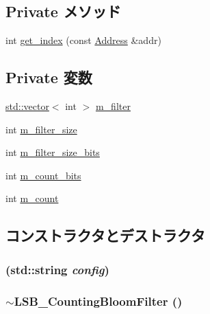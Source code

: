 \subsection*{Private メソッド}
\begin{DoxyCompactItemize}
\item 
int \hyperlink{classLSB__CountingBloomFilter_a0a9fd2f2f75033080fc27830f7c0fe64}{get\_\-index} (const \hyperlink{classAddress}{Address} \&addr)
\end{DoxyCompactItemize}
\subsection*{Private 変数}
\begin{DoxyCompactItemize}
\item 
\hyperlink{classstd_1_1vector}{std::vector}$<$ int $>$ \hyperlink{classLSB__CountingBloomFilter_aae3fd71ce4b5e8910aa63829ba6abd41}{m\_\-filter}
\item 
int \hyperlink{classLSB__CountingBloomFilter_af53abddc4707ab403450239a6e94c486}{m\_\-filter\_\-size}
\item 
int \hyperlink{classLSB__CountingBloomFilter_a5c26703945ae76ff80ec6951cccea29c}{m\_\-filter\_\-size\_\-bits}
\item 
int \hyperlink{classLSB__CountingBloomFilter_a2a94c7f05c32eec5b5e5a2f12518f930}{m\_\-count\_\-bits}
\item 
int \hyperlink{classLSB__CountingBloomFilter_af6f8fac96632a39285e8eada5e439f90}{m\_\-count}
\end{DoxyCompactItemize}


\subsection{コンストラクタとデストラクタ}
\hypertarget{classLSB__CountingBloomFilter_a5259be133a6285e824ecb2711f244585}{
\subsubsection[{LSB\_\-CountingBloomFilter}]{ (std::string {\em config})}}
\label{classLSB__CountingBloomFilter_a5259be133a6285e824ecb2711f244585}
\hypertarget{classLSB__CountingBloomFilter_a4f3340bf8dedccdde15063673cb6d70b}{
\subsubsection[{$\sim$LSB\_\-CountingBloomFilter}]{\setlength{\rightskip}{0pt plus 5cm}$\sim${\bf LSB\_\-CountingBloomFilter} ()}}
\label{classLSB__CountingBloomFilter_a4f3340bf8dedccdde15063673cb6d70b}



